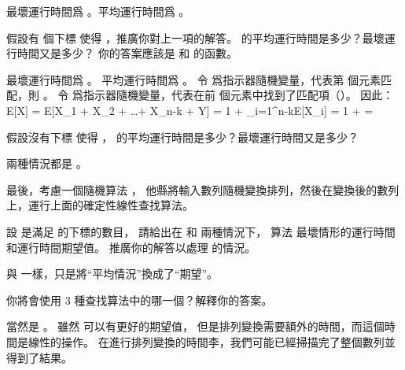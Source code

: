 \startANSWER
最壞運行時間爲 。平均運行時間爲 。
\stopANSWER

\startigBase[continue]
\item 假設有  個下標  使得 ，推廣你對上一項的解答。
 的平均運行時間是多少？最壞運行時間又是多少？
你的答案應該是  和  的函數。
\stopigBase

\startANSWER
最壞運行時間爲 。
平均運行時間爲 。
令  爲指示器隨機變量，代表第  個元素匹配，則 。
令  爲指示器隨機變量，代表在前  個元素中找到了匹配項（）。
因此：
\startformula\startmathalignment
\NC E[X] \NC= E[X_1 + X_2 + \ldots + X_{n-k} + Y] \NR
\NC      \NC= 1 + \sum_{i=1}^{n-k}E[X_i] \NR
\NC      \NC= 1 +  \NR
\NC      \NC=  \NR
\stopmathalignment\stopformula
\stopANSWER

\startigBase[continue]
\item 假設沒有下標  使得 ，
 的平均運行時間是多少？最壞運行時間又是多少？
\stopigBase

\startANSWER
兩種情況都是 。
\stopANSWER

最後，考慮一個隨機算法 ，
他縣將輸入數列隨機變換排列，然後在變換後的數列上，運行上面的確定性線性查找算法。
\startigBase[continue]
\item 設  是滿足  的下標的數目，
請給出在  和  兩種情況下，
算法  最壞情形的運行時間和運行時間期望值。
推廣你的解答以處理  的情況。
\stopigBase

\startANSWER
與  一樣，只是將“平均情況”換成了“期望”。
\stopANSWER

\startigBase[continue]
\item 你將會使用 3 種查找算法中的哪一個？解釋你的答案。
\stopigBase

\startANSWER
當然是 。
雖然  可以有更好的期望值，
但是排列變換需要額外的時間，而這個時間是線性的操作。
在進行排列變換的時間李，我們可能已經掃描完了整個數列並得到了結果。
\stopANSWER

\stopPROBLEM

\stopsubject

